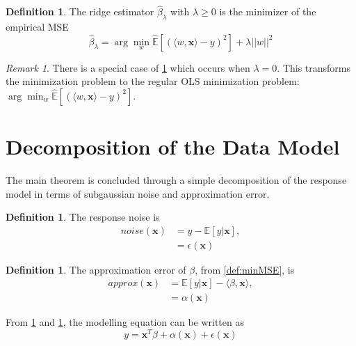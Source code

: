 \documentclass[nohyperref]{article}
\theoremstyle{plain}
\theoremstyle{definition}
\newtheorem{definition}[theorem]{Definition}
\theoremstyle{remark}
\newtheorem{remark}[theorem]{Remark}
\begin{document}
\begin{definition}
\label{def:ridgeEst}
The ridge estimator $\hat{\beta}_{\lambda}$ with $\lambda \geq 0$ is the minimizer of the empirical MSE
$$\hat{\beta}_{\lambda} = \arg \min_w \hat{\mathbb{E}}[(\langle w, \textbf{x} \rangle - y)^2] + \lambda||w||^2$$
\end{definition}

\pagebreak

\begin{remark}
There is a special case of \cref{def:ridgeEst} which occurs when $\lambda = 0$. This transforms the minimization problem to the regular OLS minimization problem: $\arg \min_w \hat{\mathbb{E}}[(\langle w, \textbf{x} \rangle - y)^2]$.
\end{remark}


\section{Decomposition of the Data Model}

The main theorem is concluded through a simple decomposition of the response model in terms of subgaussian noise and approximation error.

\begin{definition}
\label{def:noise}
The response noise is 
\begin{align*}
    noise(\textbf{x}) &= y - \mathbb{E}[y|\textbf{x}],\\
    &= \epsilon(\textbf{x})
\end{align*}
\end{definition}

\begin{definition}
\label{def:approxError}
The approximation error of $\beta$, from \cref{def:minMSE}, is 
\begin{align*}
    approx(\textbf{x}) &= \mathbb{E}[y|\textbf{x}] - \langle \beta, \textbf{x} \rangle,\\
    &= \alpha(\textbf{x})
\end{align*}
\end{definition}

From \cref{def:noise} and \cref{def:approxError}, the modelling equation can be written as $$y = \textbf{x}^T\beta + \alpha(\textbf{x}) + \epsilon(\textbf{x})$$
\end{document}
